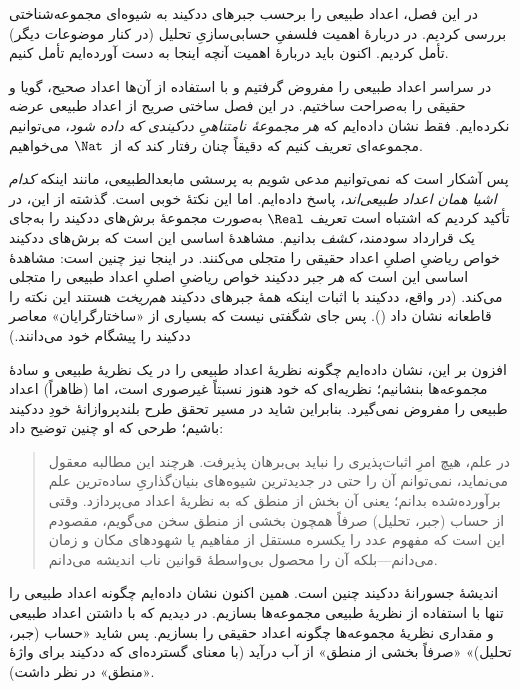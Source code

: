 \documentclass[../../../include/open-logic-section]{subfiles}
\begin{document}


در این فصل، اعداد طبیعی را برحسب جبرهای ددکیند به شیوه‌ای مجموعه‌شناختی
بررسی کردیم. در  دربارهٔ اهمیت فلسفیِ حسابی‌سازیِ
تحلیل (در کنار موضوعات دیگر) تأمل کردیم. اکنون باید دربارهٔ اهمیت آنچه
اینجا به دست آورده‌ایم تأمل کنیم.

در سراسر  اعداد طبیعی را مفروض گرفتیم و با
استفاده از آن‌ها اعداد صحیح، گویا و حقیقی را به‌صراحت ساختیم. در این فصل
ساختی صریح از اعداد طبیعی عرضه نکرده‌ایم. فقط نشان داده‌ایم که
\emph{هر مجموعهٔ نامتناهیِ ددکیندی که داده شود}، می‌توانیم مجموعه‌ای تعریف
کنیم که دقیقاً چنان رفتار کند که از~$\Nat$ می‌خواهیم.

پس آشکار است که نمی‌توانیم مدعی شویم به پرسشی مابعدالطبیعی، مانند اینکه
\emph{کدام اشیا همان اعداد طبیعی‌اند}، پاسخ داده‌ایم. اما این نکتهٔ خوبی
است. گذشته از این، در  تأکید کردیم که اشتباه
است تعریف $\Real$ به‌صورت مجموعهٔ برش‌های ددکیند را به‌جای یک قرارداد
سودمند، \emph{کشف} بدانیم. مشاهدهٔ اساسی این است که برش‌های ددکیند خواص
ریاضیِ اصلیِ اعداد حقیقی را متجلی می‌کنند. در اینجا نیز چنین است: مشاهدهٔ
اساسی این است که \emph{هر} جبر ددکیند خواص ریاضیِ اصلیِ اعداد طبیعی را
متجلی می‌کند. (در واقع، ددکیند با اثبات اینکه همهٔ جبرهای ددکیند
\emph{هم‌ریخت} هستند این نکته را قاطعانه نشان داد
(\citeyear[قضیه‌های 132--3]{Dedekind1888}). پس جای شگفتی نیست که بسیاری
از «ساختارگرایان» معاصر ددکیند را پیشگام خود می‌دانند.)

افزون بر این، نشان داده‌ایم چگونه نظریهٔ اعداد طبیعی را در یک نظریهٔ
طبیعی و سادهٔ مجموعه‌ها بنشانیم؛ نظریه‌ای که خود هنوز نسبتاً غیرصوری
است، اما (ظاهراً) اعداد طبیعی را مفروض نمی‌گیرد. بنابراین شاید در مسیر
تحقق طرح بلندپروازانهٔ خودِ ددکیند باشیم؛ طرحی که او چنین توضیح داد:
\begin{quote}
	در علم، هیچ امرِ اثبات‌پذیری را نباید بی‌برهان پذیرفت. هرچند این مطالبه
	معقول می‌نماید، نمی‌توانم آن را حتی در جدیدترین شیوه‌های بنیان‌گذاریِ
	ساده‌ترین علم برآورده‌شده بدانم؛ یعنی آن بخش از منطق که به نظریهٔ اعداد
	می‌پردازد. وقتی از حساب (جبر، تحلیل) صرفاً همچون بخشی از منطق سخن
	می‌گویم، مقصودم این است که مفهوم عدد را یکسره مستقل از مفاهیم یا شهودهای
	مکان و زمان می‌دانم---بلکه آن را محصول بی‌واسطهٔ قوانین ناب اندیشه
	می‌دانم.
	\citep[پیشگفتار]{Dedekind1888}
\end{quote}
اندیشهٔ جسورانهٔ ددکیند چنین است. همین اکنون نشان داده‌ایم چگونه اعداد
طبیعی را تنها با استفاده از نظریهٔ طبیعی مجموعه‌ها بسازیم. در
 دیدیم که با داشتن اعداد طبیعی و مقداری نظریهٔ
مجموعه‌ها چگونه اعداد حقیقی را بسازیم. پس شاید «حساب (جبر، تحلیل)» «صرفاً
بخشی از منطق» از آب درآید (با معنای گسترده‌ای که ددکیند برای واژهٔ «منطق»
در نظر داشت).
\end{document}
